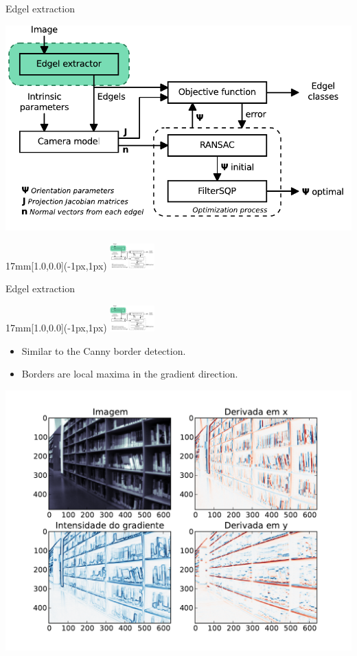 \begin{frame}{Edgel extraction}
  \centerline{\includegraphics[height=12\baselineskip]{blocos_s1.pdf}}
  \begin{textblock*}{17mm}[1.0,0.0](\paperwidth-1px,1px)%
    \includegraphics[width=17mm]{blocos_s1.png}%
  \end{textblock*}%
\end{frame}
\addtocounter{framenumber}{-1}

\begin{frame}{Edgel extraction}
  \begin{textblock*}{17mm}[1.0,0.0](\paperwidth-1px,1px)
    \includegraphics[width=17mm]{blocos_s1.png}
  \end{textblock*}
  \begin{itemize}
  \item Similar to the Canny border detection.\\
  \item Borders are local maxima in the gradient direction.
  \end{itemize}
  \centerline{\includegraphics[height=12\baselineskip]{graddemo2.pdf}}
\end{frame}

